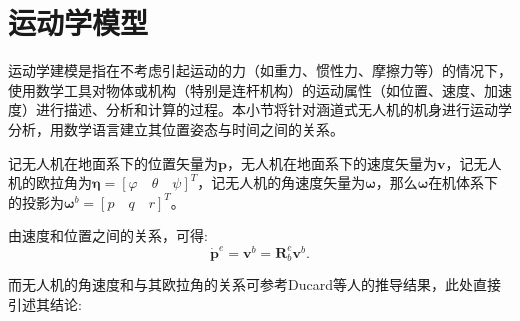 \section{运动学模型}
运动学建模是指在不考虑引起运动的力（如重力、惯性力、摩擦力等）的情况下，使用数学工具对物体或机构（特别是连杆机构）的运动属性（如位置、速度、加速度）进行描述、分析和计算的过程。本小节将针对涵道式无人机的机身进行运动学分析，用数学语言建立其位置姿态与时间之间的关系。

记无人机在地面系下的位置矢量为$\bm{p}$，无人机在地面系下的速度矢量为$\bm{v}$，记无人机的欧拉角为$\bm{\eta}=[\varphi \quad \theta \quad \psi]^T$，记无人机的角速度矢量为$\bm{\omega}$，那么$\bm{\omega}$在机体系下的投影为$\bm{\omega}^b = [p \quad q \quad r]^T$。

由速度和位置之间的关系，可得:
\begin{equation}
    \dot{\bm{p}}^e = \bm{v}^b = \bm{R}_b^e \bm{v}^b.
    \label{eq:d_pos}
\end{equation}

而无人机的角速度和与其欧拉角的关系可参考Ducard等人\cite{Ducard2009Flight}的推导结果，此处直接引述其结论:

